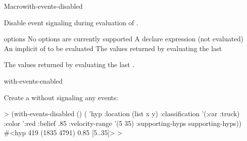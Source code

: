 \documentclass[10pt,twoside,english,pdftex]{article}
\begin{document}

\begin{functiondoc}{Macro}{with-events-disabled}%
  {\code{(}\superstar{}\code{)}
    \superstar{}
    \superstar{}
    \returns{} \superstar}
%
%
  
\fnsyntax

\fnpurpose Disable event signaling during evaluation of .

\fnpackage {}

\fnmodule {}

\fnargs
\begin{args}{options}
\arg[option] No options are currently supported
\arg[declaration] A declare expression (not evaluated)
\arg[forms] An implicit  of  to be evaluated
\arg[results] The values returned by evaluating the last 
\end{args}

\fnreturns The values returned by evaluating the last .

\begin{alsos}{with-events-enabled}
\end{alsos}

\fnexample
{}%
Create a  without signaling any events:
%
\W\supp
\begin{example}
  > (with-events-disabled ()
       ( 'hyp 
          :location (list x y)
          :classification '(:car :truck)
          :color ':red
          :belief .85
          :velocity-range '(5 35)
          :supporting-hyps supporting-hyps))
  #<hyp 419 (1835 4791) 0.85 [5..35]>
  >
\end{example}

\end{functiondoc}

\end{document}
